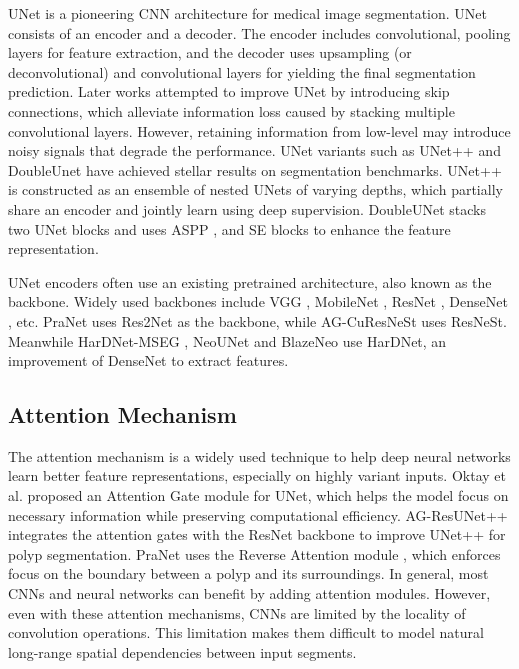 \documentclass{article}
\begin{document}
UNet \cite{unet} is a pioneering CNN architecture for medical image segmentation. UNet consists of an encoder and a decoder. The encoder includes convolutional, pooling layers for feature extraction, and the decoder uses upsampling (or deconvolutional) and convolutional layers for yielding the final segmentation prediction. Later works attempted to improve UNet by introducing skip connections, which alleviate information loss caused by stacking multiple convolutional layers. However, retaining information from low-level may introduce noisy signals that degrade the performance. UNet variants such as UNet++ \cite{unet++} and DoubleUnet \cite{doubleunet} have achieved stellar results on segmentation benchmarks. UNet++ is constructed as an ensemble of nested UNets of varying depths, which partially share an encoder and jointly learn using deep supervision. DoubleUNet stacks two UNet blocks and uses ASPP \cite{aspp}, and SE blocks \cite{seblock} to enhance the feature representation.

UNet encoders often use an existing pretrained architecture, also known as the backbone. Widely used backbones include VGG \cite{vgg}, MobileNet \cite{mobilenet}, ResNet \cite{resnet}, DenseNet \cite{densenet}, etc. PraNet \cite{pranet} uses Res2Net as the backbone, while AG-CuResNeSt \cite{agcuresnest} uses ResNeSt. Meanwhile HarDNet-MSEG \cite{hardnet_mseg}, NeoUNet \cite{ngoc2021neounet} and BlazeNeo \cite{an2022blazeneo} use HarDNet, an improvement of DenseNet to extract features.

\subsection{Attention Mechanism}
The attention mechanism is a widely used technique to help deep neural networks learn better feature representations, especially on highly variant inputs. 
Oktay et al. \cite{unetag} proposed an Attention Gate module for UNet, which helps the model focus on necessary information while preserving computational efficiency. AG-ResUNet++ \cite{hung2021ag} integrates the attention gates with the ResNet backbone to improve UNet++ \cite{unet++} for polyp segmentation. PraNet \cite{pranet} uses the Reverse Attention module \cite{ra}, which enforces focus on the boundary between a polyp and its surroundings. In general, most CNNs and neural networks can benefit by adding attention modules. However, even with these attention mechanisms, CNNs are limited by the locality of convolution operations. This limitation makes them difficult to model natural long-range spatial dependencies between input segments.
\end{document}

